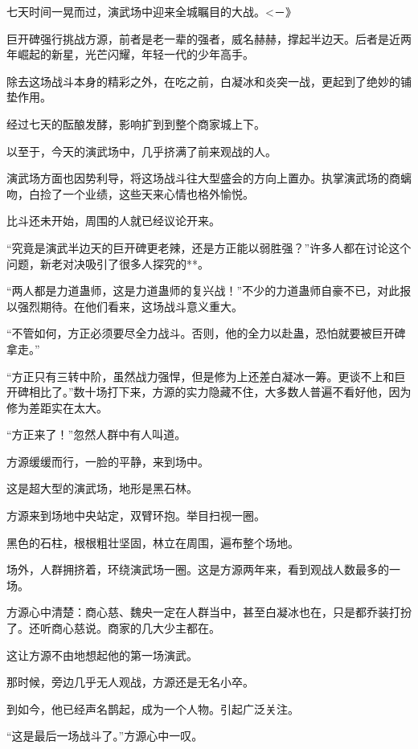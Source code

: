 
\begin{this_body}

七天时间一晃而过，演武场中迎来全城瞩目的大战。<－》

巨开碑强行挑战方源，前者是老一辈的强者，威名赫赫，撑起半边天。后者是近两年崛起的新星，光芒闪耀，年轻一代的少年高手。

除去这场战斗本身的精彩之外，在吃之前，白凝冰和炎突一战，更起到了绝妙的铺垫作用。

经过七天的酝酿发酵，影响扩到到整个商家城上下。

以至于，今天的演武场中，几乎挤满了前来观战的人。

演武场方面也因势利导，将这场战斗往大型盛会的方向上置办。执掌演武场的商螭吻，白捡了一个业绩，这些天来心情也格外愉悦。

比斗还未开始，周围的人就已经议论开来。

“究竟是演武半边天的巨开碑更老辣，还是方正能以弱胜强？”许多人都在讨论这个问题，新老对决吸引了很多人探究的**。

“两人都是力道蛊师，这是力道蛊师的复兴战！”不少的力道蛊师自豪不已，对此报以强烈期待。在他们看来，这场战斗意义重大。

“不管如何，方正必须要尽全力战斗。否则，他的全力以赴蛊，恐怕就要被巨开碑拿走。”

“方正只有三转中阶，虽然战力强悍，但是修为上还差白凝冰一筹。更谈不上和巨开碑相比了。”数十场打下来，方源的实力隐藏不住，大多数人普遍不看好他，因为修为差距实在太大。

“方正来了！”忽然人群中有人叫道。

方源缓缓而行，一脸的平静，来到场中。

这是超大型的演武场，地形是黑石林。

方源来到场地中央站定，双臂环抱。举目扫视一圈。

黑色的石柱，根根粗壮坚固，林立在周围，遍布整个场地。

场外，人群拥挤着，环绕演武场一圈。这是方源两年来，看到观战人数最多的一场。

方源心中清楚：商心慈、魏央一定在人群当中，甚至白凝冰也在，只是都乔装打扮了。还听商心慈说。商家的几大少主都在。

这让方源不由地想起他的第一场演武。

那时候，旁边几乎无人观战，方源还是无名小卒。

到如今，他已经声名鹊起，成为一个人物。引起广泛关注。

“这是最后一场战斗了。”方源心中一叹。


\end{this_body}

